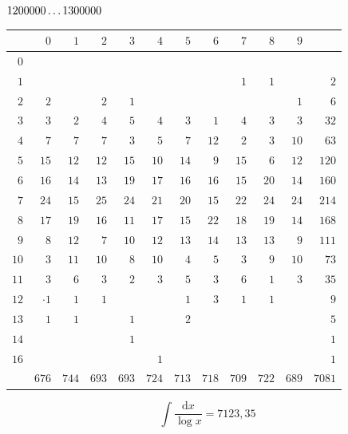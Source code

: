 \clearpage
\noindent\begin{minipage}{\linewidth}\centering
{}
\(1200000\mathinner{.\,.\,.}1300000\)\par\smallskip
\begingroup\fontsize{10.5}{11.5}\selectfont\setlength{\tabcolsep}{3.5pt}\renewcommand{\arraystretch}{1}
\begin{tabular}{r|rrrrrrrrrr|r}\hline
 & $0$ & $1$ & $2$ & $3$ & $4$ & $5$ & $6$ & $7$ & $8$ & $9$ &  \\ \hline
$0$ &  &  &  &  &  &  &  &  &  &  &  \\
$1$ &  &  &  &  &  &  &  & $1$ & $1$ &  & $2$ \\
$2$ & $2$ &  & $2$ & $1$ &  &  &  &  &  & $1$ & $6$ \\
$3$ & $3$ & $2$ & $4$ & $5$ & $4$ & $3$ & $1$ & $4$ & $3$ & $3$ & $32$ \\
$4$ & $7$ & $7$ & $7$ & $3$ & $5$ & $7$ & $12$ & $2$ & $3$ & $10$ & $63$ \\
$5$ & $15$ & $12$ & $12$ & $15$ & $10$ & $14$ & $9$ & $15$ & $6$ & $12$ & $120$ \\
$6$ & $16$ & $14$ & $13$ & $19$ & $17$ & $16$ & $16$ & $15$ & $20$ & $14$ & $160$ \\
$7$ & $24$ & $15$ & $25$ & $24$ & $21$ & $20$ & $15$ & $22$ & $24$ & $24$ & $214$ \\
$8$ & $17$ & $19$ & $16$ & $11$ & $17$ & $15$ & $22$ & $18$ & $19$ & $14$ & $168$ \\
$9$ & $8$ & $12$ & $7$ & $10$ & $12$ & $13$ & $14$ & $13$ & $13$ & $9$ & $111$ \\
$10$ & $3$ & $11$ & $10$ & $8$ & $10$ & $4$ & $5$ & $3$ & $9$ & $10$ & $73$ \\
$11$ & $3$ & $6$ & $3$ & $2$ & $3$ & $5$ & $3$ & $6$ & $1$ & $3$ & $35$ \\
$12$ & $\mathord{\cdot}\!1$ & $1$ & $1$ &  &  & $1$ & $3$ & $1$ & $1$ &  & $9$ \\
$13$ & $1$ & $1$ &  & $1$ &  & $2$ &  &  &  &  & $5$ \\
$14$ &  &  &  & $1$ &  &  &  &  &  &  & $1$ \\
$16$ &  &  &  &  & $1$ &  &  &  &  &  & $1$ \\
\hline
 & $676$ & $744$ & $693$ & $693$ & $724$ & $713$ & $718$ & $709$ & $722$ & $689$ & $7081$ \\ \hline
\end{tabular}\par\endgroup
\setlength{\abovedisplayskip}{6pt}\setlength{\belowdisplayskip}{4pt}
\[\int\frac{\mathrm{d}x}{\log x}=7123{,}35\]
\end{minipage}

